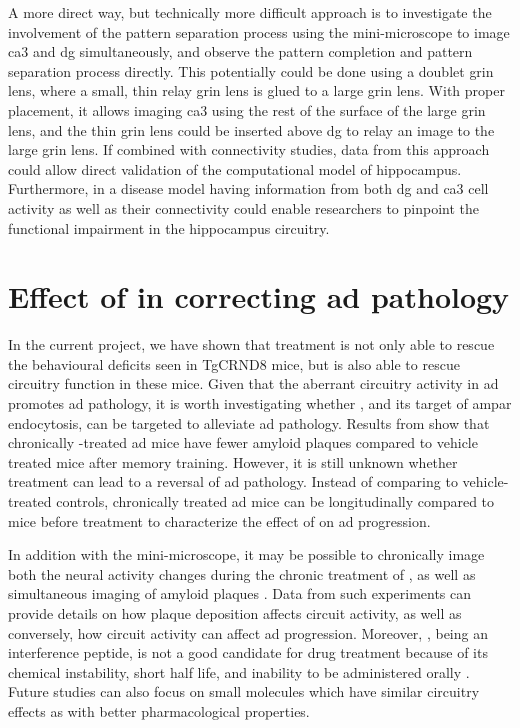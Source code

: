 A more direct way, but technically more difficult approach is to investigate the involvement of the pattern separation process using the mini-microscope to image \gls{ca3} and \gls{dg} simultaneously, and observe the pattern completion and pattern separation process directly. This potentially could be done using a doublet \gls{grin} lens, where a small, thin relay \gls{grin} lens is glued to a large \gls{grin} lens. With proper placement, it allows imaging \gls{ca3} using the rest of the surface of the large \gls{grin} lens, and the thin \gls{grin} lens could be inserted above \gls{dg} to relay an image to the large \gls{grin} lens. If combined with connectivity studies, data from this approach could allow direct validation of the computational model of hippocampus. Furthermore, in a disease model having information from both \gls{dg} and \gls{ca3} cell activity as well as their connectivity could enable researchers to pinpoint the functional impairment in the hippocampus circuitry.

\section{Effect of \tglu{} in correcting \gls{ad} pathology}

In the current project, we have shown that \tglu{} treatment is not only able to rescue the behavioural deficits seen in TgCRND8 mice, but is also able to rescue circuitry function in these mice. Given that the aberrant circuitry activity in \gls{ad} promotes \gls{ad} pathology, it is worth investigating whether \tglu{}, and its target of \gls{ampar} endocytosis, can be targeted to alleviate \gls{ad} pathology. Results from \citet{dong15} show that chronically \tglu{}-treated \gls{ad} mice have fewer amyloid plaques compared to vehicle treated mice after memory training. However, it is still unknown whether \tglu{} treatment can lead to a reversal of \gls{ad} pathology. Instead of comparing to vehicle-treated controls, chronically treated \gls{ad} mice can be longitudinally compared to mice before treatment to characterize the effect of \tglu{} on \gls{ad} progression.

In addition with the mini-microscope, it may be possible to chronically image both the neural activity changes during the chronic treatment of \tglu{}, as well as simultaneous imaging of amyloid plaques \citep{zhang15}. Data from such experiments can provide details on how plaque deposition affects circuit activity, as well as conversely, how circuit activity can affect \gls{ad} progression. Moreover, \tglu{}, being an interference peptide, is not a good candidate for drug treatment because of its chemical instability, short half life, and inability to be administered orally \citep{fosgerau15}. Future studies can also focus on small molecules which have similar circuitry effects as \tglu{} with better pharmacological properties.


